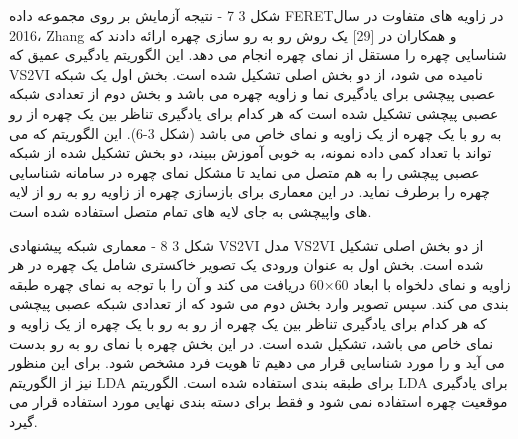 شکل ‏3 7 - نتیجه آزمایش بر روی مجموعه داده  FERETدر زاویه های متفاوت
در سال 2016، Zhang و همکاران در [29] یک روش رو به رو سازی  چهره ارائه دادند که شناسایی چهره را مستقل از نمای چهره  انجام می دهد. این الگوریتم یادگیری عمیق که VS2VI نامیده می شود، از دو بخش اصلی تشکیل شده است. بخش اول یک شبکه عصبی پیچشی برای یادگیری نما و زاویه چهره می باشد و بخش دوم از تعدادی شبکه عصبی پیچشی تشکیل شده است که هر کدام برای یادگیری تناظر  بین یک چهره از رو به رو با یک چهره از یک زاویه و نمای خاص می باشد (شکل 3-6). این الگوریتم که می تواند با تعداد کمی داده نمونه، به خوبی آموزش ببیند، دو بخش تشکیل شده از شبکه عصبی پیچشی را به هم متصل می نماید تا مشکل نمای چهره در سامانه شناسایی چهره را برطرف نماید. در این معماری برای بازسازی چهره از زاویه رو به رو از لایه های واپیچشی  به جای لایه های تمام متصل استفاده شده است.
 
شکل ‏3 8 - معماری شبکه پیشنهادی VS2VI
مدل VS2VI از دو بخش اصلی تشکیل شده است. بخش اول به عنوان ورودی یک تصویر خاکستری  شامل یک چهره در هر زاویه و نمای دلخواه با ابعاد 60×60 دریافت می کند و آن را با توجه به نمای چهره طبقه بندی  می کند. سپس تصویر وارد بخش دوم می شود که از تعدادی شبکه عصبی پیچشی که هر کدام برای یادگیری تناظر  بین یک چهره از رو به رو با یک چهره از یک زاویه و نمای خاص می باشد، تشکیل شده است. در این بخش چهره با نمای رو به رو بدست می آید و را مورد شناسایی قرار می دهیم تا هویت فرد مشخص شود. برای این منظور نیز از الگوریتم LDA  برای طبقه بندی استفاده شده است. الگوریتم LDA برای یادگیری موقعیت چهره استفاده نمی شود و فقط برای دسته بندی نهایی مورد استفاده قرار می گیرد.
 
